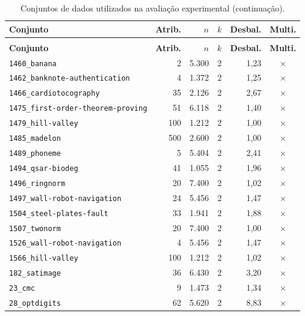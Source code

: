 \footnotesize
\setlength{\tabcolsep}{4pt}
\begin{longtable}{lrrrrc}
    \caption{Conjuntos de dados utilizados na avaliação experimental.}
    \label{tab:ap_conjuntos}\\
    \hline
    \textbf{Conjunto} & \textbf{Atrib.} & \textbf{$n$} & \textbf{$k$} & \textbf{Desbal.} & \textbf{Multi.} \\
    \hline
    \endfirsthead
    \caption[]{Conjuntos de dados utilizados na avaliação experimental (continuação).}\\
    \hline
    \textbf{Conjunto} & \textbf{Atrib.} & \textbf{$n$} & \textbf{$k$} & \textbf{Desbal.} & \textbf{Multi.} \\
    \hline
    \endhead
    \hline
    \endfoot
    \texttt{1460\_banana} & 2 & 5.300 & 2 & 1,23 & $\times$ \\
    \texttt{1462\_banknote-authentication} & 4 & 1.372 & 2 & 1,25 & $\times$ \\
    \texttt{1466\_cardiotocography} & 35 & 2.126 & 2 & 2,67 & $\times$ \\
    \texttt{1475\_first-order-theorem-proving} & 51 & 6.118 & 2 & 1,40 & $\times$ \\
    \texttt{1479\_hill-valley} & 100 & 1.212 & 2 & 1,00 & $\times$ \\
    \texttt{1485\_madelon} & 500 & 2.600 & 2 & 1,00 & $\times$ \\
    \texttt{1489\_phoneme} & 5 & 5.404 & 2 & 2,41 & $\times$ \\
    \texttt{1494\_qsar-biodeg} & 41 & 1.055 & 2 & 1,96 & $\times$ \\
    \texttt{1496\_ringnorm} & 20 & 7.400 & 2 & 1,02 & $\times$ \\
    \texttt{1497\_wall-robot-navigation} & 24 & 5.456 & 2 & 1,47 & $\times$ \\
    \texttt{1504\_steel-plates-fault} & 33 & 1.941 & 2 & 1,88 & $\times$ \\
    \texttt{1507\_twonorm} & 20 & 7.400 & 2 & 1,00 & $\times$ \\
    \texttt{1526\_wall-robot-navigation} & 4 & 5.456 & 2 & 1,47 & $\times$ \\
    \texttt{1566\_hill-valley} & 100 & 1.212 & 2 & 1,02 & $\times$ \\
    \texttt{182\_satimage} & 36 & 6.430 & 2 & 3,20 & $\times$ \\
    \texttt{23\_cmc} & 9 & 1.473 & 2 & 1,34 & $\times$ \\
    \texttt{28\_optdigits} & 62 & 5.620 & 2 & 8,83 & $\times$ \\

\end{longtable}
